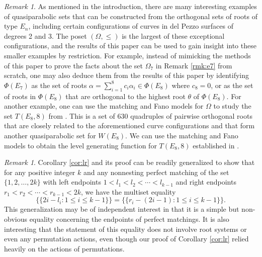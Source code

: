 \documentclass[11pt]{amsart}
\theoremstyle{plain}
\theoremstyle{definition}
\theoremstyle{remark}
\newtheorem{rmk}[theorem]{Remark}
\numberwithin{equation}{section}
\newcommand{\al}{\alpha}
\newcommand{\mset}[1]{\{\!\{#1\}\!\}}
\newcommand{\ob}{\Omega}
\begin{document}
\begin{rmk}\label{rmk:restriction}
As mentioned in the introduction, there are many interesting examples of
quasiparabolic sets that can be constructed from the orthogonal sets of roots of
type $E_n$, including certain configurations of curves in del Pezzo surfaces of
degrees 2 and 3. The poset $(\ob, \leq)$ is the largest of these exceptional
configurations, and the results of this paper can be used to gain insight into
these smaller examples by restriction. For example, instead of mimicking the
methods of this paper to prove the facts about the set $\ob_7$ in Remark
\ref{rmk:e7} from scratch, one may also deduce them from the results of this
paper by identifying $\Phi(E_7)$ as the set of roots $\al=\sum_{i=1}^8
c_i\al_i\in \Phi(E_8)$ where $c_8=0$, or as the set of roots in $\Phi(E_8)$ that
are orthogonal to the highest root $\theta$ of $\Phi(E_8)$. For another example,
one can use the matching and Fano models for $\ob$ to study the set $T(E_8,8)$
from \cite[Section 5.1]{gx6}. This is a set of 630 quadruples of pairwise
orthogonal roots that are closely related to the aforementioned curve
configurations and that form another quasiparabolic set for $W(E_8)$. We can use
the matching and Fano models to obtain the level generating function for $T(E_8,
8)$ established in \cite[Remark 5.10 (i)]{gx6}. \end{rmk}


\begin{rmk}
\label{rmk:lr}
Corollary \ref{cor:lr} and its proof can be readily generalized to show that for
any positive integer $k$ and 
any nonnesting perfect matching of the set $\{1,2,\dots, 2k\}$
with left endpoints $1<l_1<l_2<\cdots <l_{k-1}$ and right endpoints
$r_1<r_2<\cdots<r_{k-1}<2k$, we have the multiset equality
\[
  \mset{2i-l_i:1\le i\le {k-1}}=\mset{r_i-(2i-1): 1\le
i\le k-1}.
\]
This generalization may be of independent interest in that it is a simple but
non-obvious equality concerning the endpoints of perfect matchings. It is also
interesting that the statement of this equality does not involve root systems or
even any permutation actions, even though our proof of Corollary \ref{cor:lr}
relied heavily on the actions of permutations.
\end{rmk}
\end{document}
